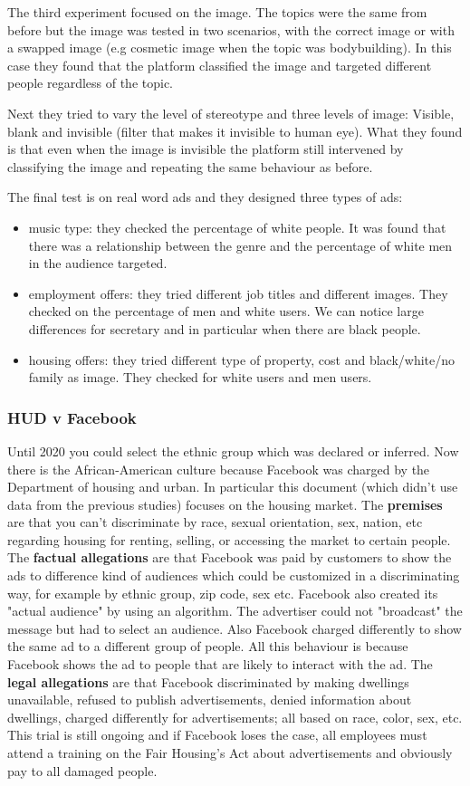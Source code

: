 The third experiment focused on the image. The topics were the same from before but the image was tested in two scenarios, with the correct image or with a swapped image (e.g cosmetic image when the topic was bodybuilding). In this case they found that the platform classified the image and targeted different people regardless of the topic.

Next they tried to vary the level of stereotype and three levels of image: Visible, blank and invisible (filter that makes it invisible to human eye). What they found is that even when the image is invisible the platform still intervened by classifying the image and repeating the same behaviour as before.

The final test is on real word ads and they designed three types of ads:
\begin{itemize}
    \item music type: they checked the percentage of white people. It was found that there was a relationship between the genre and the percentage of white men in the audience targeted.
    \item employment offers: they tried different job titles and different images. They checked on the percentage of men and white users. We can notice large differences for secretary and in particular when there are black people.
    \item housing offers: they tried different type of property, cost and black/white/no family as image. They checked for white users and men users.
\end{itemize}
\subsubsection{HUD v Facebook}
Until 2020 you could select the ethnic group which was declared or inferred. Now there is the African-American culture because Facebook was charged by the Department of housing and urban. In particular this document (which didn't use data from the previous studies) focuses on the housing market. The \textbf{premises} are that you can't discriminate by race, sexual orientation, sex, nation, etc regarding housing for renting, selling, or accessing the market to certain people. The \textbf{factual allegations} are that Facebook was paid by customers to show the ads to difference kind of audiences which could be customized in a discriminating way, for example by ethnic group, zip code, sex etc. Facebook also created its "actual audience" by using an algorithm. The advertiser could not "broadcast" the message but had to select an audience. Also Facebook charged differently to show the same ad to a different group of people. All this behaviour is because Facebook shows the ad to people that are likely to interact with the ad. The \textbf{legal allegations} are that Facebook discriminated by making dwellings unavailable, refused to publish advertisements, denied information about dwellings, charged differently for advertisements; all based on race, color, sex, etc. This trial is still ongoing and if Facebook loses the case, all employees must attend a training on the Fair Housing's Act about advertisements and obviously pay to all damaged people.
